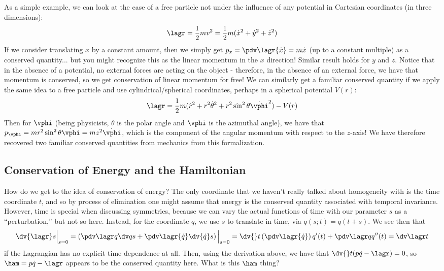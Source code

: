 \documentclass[12pt]{article}
\begin{document}
As a simple example, we can look at the case of a free particle not under the
influence of any potential in Cartesian coordinates (in three dimensions):
\[
	\lagr = \frac{1}{2} m v^2 = \frac{1}{2} m ( \dot{x}^2 + \dot{y}^2 + \dot{z}^2 )
\]
If we consider translating $x$ by a constant amount, then we simply get $p_x =
\pdv \lagr{\dot x} = m \dot x$ (up to a constant multiple) as a conserved
quantity... but you might recognize this as the linear momentum in the $x$
direction! Similar result holds for $y$ and $z$. 
Notice that in the absence of a potential, no external forces are acting on the
object - therefore, in the absence of an external force, we have that momentum
is conserved, 
so we get conservation of linear momentum for free! We can similarly get
a familiar conserved quantity if we apply the same idea to a free particle 
and use cylindrical/spherical coordinates, perhaps in a spherical
potential $V(r)$: 
\[
 \lagr = \frac{1}{2} m (\dot r^2 + r^2 \dot \theta^2 + r^2 \sin^2\theta \dot
 \vphi^2) - V(r)
\]
Then for $\vphi$ (being physicists, $\theta$ is the polar angle and $\vphi$ is
the azimuthal angle), we have that $p_\vphi = m r^2 \sin^2 \theta \dot \vphi = m
z^2 \dot \vphi$, which is the component of the angular momentum with respect to
the $z$-axis! We have therefore recovered two familiar conserved quantities from
mechanics from this formalization. 

\subsection{Conservation of Energy and the Hamiltonian}
How do we get to the idea of conservation of energy? The only coordinate that we
haven't really talked about homogeneity with is the time coordinate $t$, and so
by process of elimination one might assume that energy is the conserved quantity
associated with temporal invariance. However, time is special when discussing
symmetries, because we can vary the actual functions of time with our parameter
$s$ as a ``perturbation,'' but not so here. Instead, for the coordinate $q$, we
use $s$ to translate in time, via $q(s; t) = q(t + s)$. We see then that 
\[
 \dv{\lagr}s \Big|_{s = 0} = \left( \pdv \lagr q \dv q s + \pdv \lagr {\dot q}
   \dv {\dot q} s\right)\Big|_{s = 0} = \dv{} t \left( \pdv \lagr {\dot q}
 \right) q'(t) + \pdv \lagr q q''(t) = \dv \lagr t 
\]
if the Lagrangian has no explicit time dependence at all. 
Then, using the derivation above, we have that $\dv{}t (p \dot q - \lagr) = 0$, so
$\ham = p \dot q - \lagr$ appears to be the conserved quantity here. What is
this $\ham$ thing? 
\end{document}
